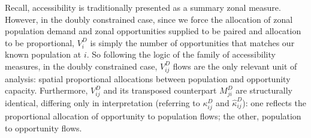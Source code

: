 \documentclass[
  10pt,
  letterpaper,
]{article}
\begin{document}
\begin{table}

\caption{\label{tbl-adjusted-small-system-land-use-doubly-constrained-case-allfs-access-values-for-zone2}Doubly
constrained accessible opportunities at Zone 2 for all travel decay
groups in the modified simple system.}


\end{table}%

Recall, accessibility is traditionally presented as a summary zonal
measure. However, in the doubly constrained case, since we force the
allocation of zonal population demand and zonal opportunities supplied
to be paired and allocation to be proportional, \(V_i^D\) is simply the
number of opportunities that matches our known population at \(i\). So
following the logic of the family of accessibility measures, in the
doubly constrained case, \(V_{ij}^D\) flows are the only relevant unit
of analysis: spatial proportional allocations between population and
opportunity capacity. Furthermore, \(V^D_{ij}\) and its transposed
counterpart \(M^D_{ji}\) are structurally identical, differing only in
interpretation (referring to \(\kappa_{ij}^D\) and
\(\hat \kappa_{ij}^D\)): one reflects the proportional allocation of
opportunity to population flows; the other, population to opportunity
flows.
\end{document}
